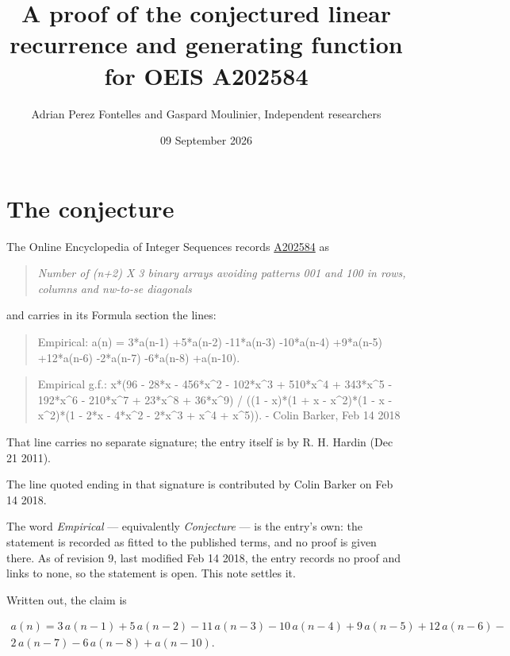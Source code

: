 \documentclass[11pt]{article}
\title{A proof of the conjectured linear recurrence and generating function for OEIS A202584}
\author{Adrian Perez Fontelles and Gaspard Moulinier, Independent researchers}
\date{09 September 2026}
\theoremstyle{definition}
\begin{document}
\maketitle
\section{The conjecture}

The Online Encyclopedia of Integer Sequences records \href{https://oeis.org/A202584}{A202584} as

\begin{quote}\itshape Number of (n+2) X 3 binary arrays avoiding patterns 001 and 100 in rows, columns and nw-to-se diagonals\end{quote}

and carries in its Formula section the lines:

\begin{quote}\ttfamily Empirical: a(n) = 3*a(n-1) +5*a(n-2) -11*a(n-3) -10*a(n-4) +9*a(n-5) +12*a(n-6) -2*a(n-7) -6*a(n-8) +a(n-10).\end{quote}

\begin{quote}\ttfamily Empirical g.f.: x*(96 - 28*x - 456*x\textasciicircum{}2 - 102*x\textasciicircum{}3 + 510*x\textasciicircum{}4 + 343*x\textasciicircum{}5 - 192*x\textasciicircum{}6 - 210*x\textasciicircum{}7 + 23*x\textasciicircum{}8 + 36*x\textasciicircum{}9) / ((1 - x)*(1 + x - x\textasciicircum{}2)*(1 - x - x\textasciicircum{}2)*(1 - 2*x - 4*x\textasciicircum{}2 - 2*x\textasciicircum{}3 + x\textasciicircum{}4 + x\textasciicircum{}5)). - Colin Barker, Feb 14 2018\end{quote}

That line carries no separate signature; the entry itself is by R. H. Hardin (Dec 21 2011).

The line quoted ending in that signature is contributed by Colin Barker on Feb 14 2018.

The word {\itshape Empirical} --- equivalently {\itshape Conjecture} --- is the entry's own: the statement is recorded as fitted to the published terms, and no proof is given there. As of revision 9, last modified Feb 14 2018, the entry records no proof and links to none, so the statement is open. This note settles it.

Written out, the claim is

\begin{multline*} a(n) = 3\,a(n-1) + 5\,a(n-2) - 11\,a(n-3) - 10\,a(n-4) + 9\,a(n-5) + 12\,a(n-6) - \\ 2\,a(n-7) - 6\,a(n-8) + a(n-10). \end{multline*}
\end{document}
